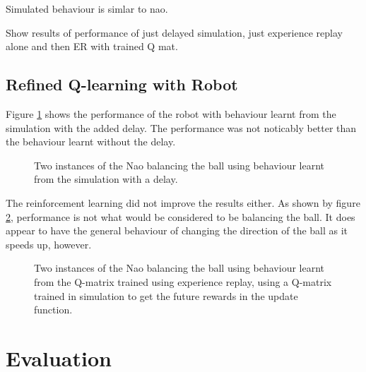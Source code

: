 \documentclass[12pt,a4paper]{article}
\begin{document}




Simulated behaviour is simlar to nao. 

Show results of performance of just delayed simulation, just experience replay alone and then ER with trained Q mat.
\subsection{Refined Q-learning with Robot}
Figure \ref{delay_noer_1} shows the performance of the robot with behaviour learnt from the simulation with the added delay. The performance was not noticably better than the behaviour learnt without the delay. 
\begin{figure}[H]
	\centering
	\caption{Two instances of the Nao balancing the ball using behaviour learnt from the simulation with a delay.}
	\label{delay_noer_1}
\end{figure}

The reinforcement learning did not improve the results either. As shown by figure \ref{er_nao}, performance is not what would be considered to be balancing the ball. It does appear to have the general behaviour of changing the direction of the ball as it speeds up, however. 
\begin{figure}[H]
	\centering
    \subfloat[Instance 1]{{\texttt{[image: 36\_er]} }}%
    \subfloat[Instance 2]{{\texttt{[image: 37\_er]} }}%
	\caption{Two instances of the Nao balancing the ball using behaviour learnt from the Q-matrix trained using experience replay, using a Q-matrix trained in simulation to get the future rewards in the update function.}
	\label{er_nao}
\end{figure}

\section{Evaluation}
\end{document}
